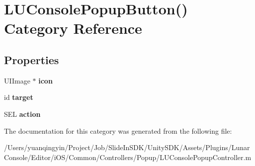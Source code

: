 \hypertarget{category_l_u_console_popup_button_07_08}{}\section{L\+U\+Console\+Popup\+Button() Category Reference}
\label{category_l_u_console_popup_button_07_08}
\subsection*{Properties}
\begin{DoxyCompactItemize}
\item 
\mbox{\label{category_l_u_console_popup_button_07_08_a2268679db12bda98874b3159f1c62d41}} 
U\+I\+Image $\ast$ {\bfseries icon}
\item 
\mbox{\label{category_l_u_console_popup_button_07_08_a7acb8209bd2e0b53da0e0c048e14120c}} 
id {\bfseries target}
\item 
\mbox{\label{category_l_u_console_popup_button_07_08_a8938ecc4436796b9f25e88e89f39c87c}} 
S\+EL {\bfseries action}
\end{DoxyCompactItemize}


The documentation for this category was generated from the following file\+:\begin{DoxyCompactItemize}
\item 
/\+Users/yuanqingyin/\+Project/\+Job/\+Slide\+In\+S\+D\+K/\+Unity\+S\+D\+K/\+Assets/\+Plugins/\+Lunar\+Console/\+Editor/i\+O\+S/\+Common/\+Controllers/\+Popup/L\+U\+Console\+Popup\+Controller.\+m\end{DoxyCompactItemize}
